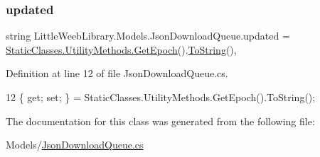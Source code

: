\subsubsection{\texorpdfstring{updated}{updated}}
{\footnotesize\ttfamily string Little\+Weeb\+Library.\+Models.\+Json\+Download\+Queue.\+updated = \mbox{\hyperlink{class_little_weeb_library_1_1_static_classes_1_1_utility_methods_a12336d9e64983ddabaad8950486fafb2}{Static\+Classes.\+Utility\+Methods.\+Get\+Epoch}}().\mbox{\hyperlink{class_little_weeb_library_1_1_models_1_1_json_download_queue_a0613fd2171f103708bdc981048f3b80c}{To\+String}}()\hspace{0.3cm}{\ttfamily [get]}, {\ttfamily [set]}}



Definition at line 12 of file Json\+Download\+Queue.\+cs.


\begin{DoxyCode}
12 \{ \textcolor{keyword}{get}; \textcolor{keyword}{set}; \} = StaticClasses.UtilityMethods.GetEpoch().ToString();
\end{DoxyCode}


The documentation for this class was generated from the following file\+:\begin{DoxyCompactItemize}
\item 
Models/\mbox{\hyperlink{_json_download_queue_8cs}{Json\+Download\+Queue.\+cs}}\end{DoxyCompactItemize}

